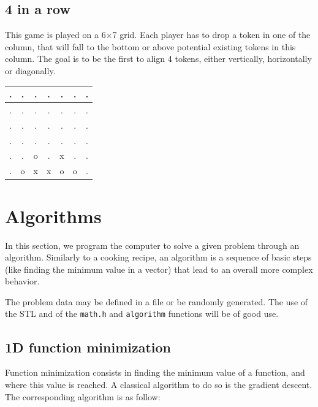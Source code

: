 \documentclass{ecnreport}
\begin{document}
\subsection{4 in a row}

This game is played on a 6$\times$7 grid. Each player has to drop a token in one of the column, that will fall to the bottom or above potential existing tokens in this column.
The goal is to be the first to align 4 tokens, either vertically, horizontally or diagonally.

\begin{center}
 \begin{tabular}{|c|c|c|c|c|c|c|}
 \hline  
 . &.&.&.&. &.&.\\\hline
 . &.&.&.&. &.&.\\\hline
 . &.&.&.&. &.&.\\\hline
 . &.&.&.&. &.&.\\\hline
 . &.&o&.&x &.&.\\\hline
 . &o&x&x&o &o&.\\\hline
 \end{tabular}
\end{center}
\begin{itemize}
\end{itemize}

\newpage

\section{Algorithms}

In this section, we program the computer to solve a given problem through an algorithm. Similarly to a cooking recipe, an algorithm is a sequence of basic steps (like finding the minimum value in a vector) that lead to an overall more complex behavior.

The problem data may be defined in a file or be randomly generated.
The use of the STL and of the \texttt{math.h} and \texttt{algorithm} functions will be of good use. 

\subsection{1D function minimization}

Function minimization consists in finding the minimum value of a function, and where this value is reached. A classical algorithm to do so is the gradient descent. The corresponding algorithm is as follow:
\end{document}

